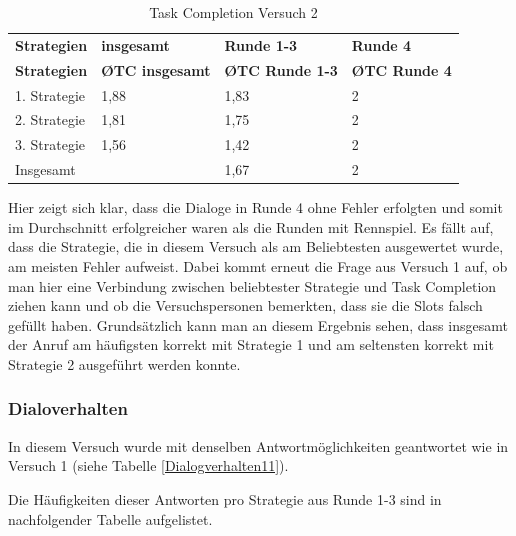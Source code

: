 \documentclass[12pt,a4paper]{scrartcl}
\begin{document}
\begin{longtable}{p{3cm}p{3cm}p{3cm}p{3cm} }
	\label{TCV2}\\
	\caption[Task Completion Versuch 2]{Task Completion Versuch 2}\\
	\hline
\textbf{Strategien}&\textbf{insgesamt}&\textbf{Runde 1-3} &\textbf{Runde 4}\\
	\hline
	\endfirsthead
	\hline
	\textbf{Strategien}&\textbf{\O TC insgesamt}&\textbf{\O TC Runde 1-3} &\textbf{\O TC Runde 4}\\
	\hline
	\endhead
1. Strategie & 1,88 & 1,83 & 2  \\
2. Strategie & 1,81 & 1,75 & 2  \\
3. Strategie & 1,56 & 1,42 & 2  \\
\hline
Insgesamt & & 1,67 & 2 \\ 
\hline
\end{longtable}

Hier zeigt sich klar, dass die Dialoge in Runde 4 ohne Fehler erfolgten und somit im Durchschnitt erfolgreicher waren als die Runden mit Rennspiel. Es fällt auf, dass die Strategie, die in diesem Versuch als am Beliebtesten ausgewertet wurde, am meisten Fehler aufweist. Dabei kommt erneut die Frage aus Versuch 1 auf, ob man hier eine Verbindung zwischen beliebtester Strategie und Task Completion ziehen kann und ob die Versuchspersonen bemerkten, dass sie die Slots falsch gefüllt haben. 
Grundsätzlich kann man an diesem Ergebnis sehen, dass insgesamt der Anruf am häufigsten korrekt mit Strategie 1 und am seltensten korrekt mit Strategie 2 ausgeführt werden konnte. 

\subsubsection{Dialoverhalten}
In diesem Versuch wurde mit denselben Antwortmöglichkeiten geantwortet wie in Versuch 1 (siehe Tabelle \ref{Dialogverhalten11}).

Die Häufigkeiten dieser Antworten pro Strategie aus Runde 1-3 sind in nachfolgender Tabelle aufgelistet.
\end{document}
